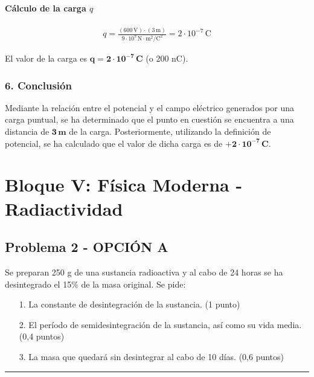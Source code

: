 \paragraph*{Cálculo de la carga $q$}
\begin{gather}
    q = \frac{(600 \, \text{V}) \cdot (3 \, \text{m})}{9 \cdot 10^9 \, \text{N}\cdot\text{m}^2/\text{C}^2} = 2 \cdot 10^{-7} \, \text{C}
\end{gather}
\begin{cajaresultado}
    El valor de la carga es $\boldsymbol{q = 2 \cdot 10^{-7} \, \textbf{C}}$ (o 200 nC).
\end{cajaresultado}

\subsubsection*{6. Conclusión}
\begin{cajaconclusion}
    Mediante la relación entre el potencial y el campo eléctrico generados por una carga puntual, se ha determinado que el punto en cuestión se encuentra a una distancia de $\mathbf{3 \, m}$ de la carga. Posteriormente, utilizando la definición de potencial, se ha calculado que el valor de dicha carga es de $\mathbf{+2 \cdot 10^{-7} \, C}$.
\end{cajaconclusion}

\newpage

\section{Bloque V: Física Moderna - Radiactividad}
\label{sec:nuclear1_2004_sep_cv}

\subsection{Problema 2 - OPCIÓN A}
\label{subsec:5A_2004_sep_cv}

\begin{cajaenunciado}
Se preparan 250 g de una sustancia radioactiva y al cabo de 24 horas se ha desintegrado el 15\% de la masa original. Se pide:
\begin{enumerate}
    \item[1.] La constante de desintegración de la sustancia. (1 punto)
    \item[2.] El período de semidesintegración de la sustancia, así como su vida media. (0,4 puntos)
    \item[3.] La masa que quedará sin desintegrar al cabo de 10 días. (0,6 puntos)
\end{enumerate}
\end{cajaenunciado}
\hrule

